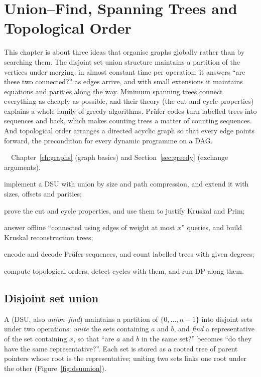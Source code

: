 \chapter{Union--Find, Spanning Trees and Topological Order}\label{ch:dsu}

This chapter is about three ideas that organise graphs globally rather than by searching them. The disjoint set union
structure maintains a partition of the vertices under merging, in almost constant time per operation; it answers ``are these
two connected?'' as edges arrive, and with small extensions it maintains equations and parities along the way. Minimum
spanning trees connect everything as cheaply as possible, and their theory (the cut and cycle properties) explains a whole
family of greedy algorithms. Prüfer codes turn labelled trees into sequences and back, which makes counting trees a matter of
counting sequences. And topological order arranges a directed acyclic graph so that every edge points forward, the
precondition for every dynamic programme on a DAG.

\begin{chapterintro}{\gold\ \plat\ \ioi}{Chapter~\ref{ch:graphs} (graph basics) and Section~\ref{sec:greedy} (exchange
arguments).}
  \item implement a DSU with union by size and path compression, and extend it with sizes, offsets and parities;
  \item prove the cut and cycle properties, and use them to justify Kruskal and Prim;
  \item answer offline ``connected using edges of weight at most $x$'' queries, and build Kruskal reconstruction trees;
  \item encode and decode Prüfer sequences, and count labelled trees with given degrees;
  \item compute topological orders, detect cycles with them, and run DP along them.
\end{chapterintro}

\section[Disjoint set union]{Disjoint set union \hfill \gold}\label{sec:dsu}

A  (DSU, also \emph{union--find}) maintains a partition of $\{0, \ldots, n - 1\}$ into disjoint sets
under two operations: \emph{unite} the sets containing $a$ and $b$, and \emph{find} a representative of the set containing
$x$, so that ``are $a$ and $b$ in the same set?'' becomes ``do they have the same representative?''. Each set is stored as a
rooted tree of parent pointers whose root is the representative; uniting two sets links one root under the other
(Figure~\ref{fig:dsuunion}).

